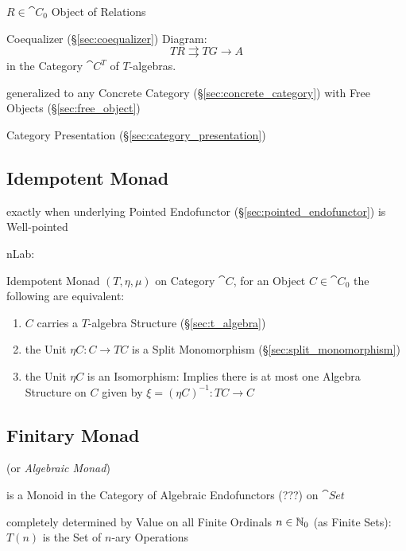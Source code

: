 $R \in \cat{C}_0$ Object of Relations

Coequalizer (\S\ref{sec:coequalizer}) Diagram:
\[
  T R \rightrightarrows T G \rightarrow A
\]
in the Category $\cat{C}^T$ of $T$-algebras. %

generalized to any Concrete Category (\S\ref{sec:concrete_category})
with Free Objects (\S\ref{sec:free_object}) %

Category Presentation (\S\ref{sec:category_presentation})



\subsection{Idempotent Monad}\label{sec:idempotent_monad}

exactly when underlying Pointed Endofunctor
(\S\ref{sec:pointed_endofunctor}) is Well-pointed

nLab:

Idempotent Monad $(T, \eta, \mu)$ on Category $\cat{C}$, for an Object
$C \in \cat{C}_0$ the following are equivalent:
\begin{enumerate}
  \item $C$ carries a $T$-algebra Structure (\S\ref{sec:t_algebra})
  \item the Unit $\eta C : C \rightarrow T C$ is a Split Monomorphism
    (\S\ref{sec:split_monomorphism})
  \item the Unit $\eta C$ is an Isomorphism: Implies there is at most
    one Algebra Structure on $C$ given by $\xi = (\eta C)^{-1} : T C
    \rightarrow C$ %
\end{enumerate}



\subsection{Finitary Monad}\label{sec:finitary_monad}

(or \emph{Algebraic Monad})

is a Monoid in the Category of Algebraic Endofunctors (???) on
$\cat{Set}$

completely determined by Value on all Finite Ordinals $n \in \mathbb{N}_0$
(as Finite Sets): $T(n)$ is the Set of $n$-ary Operations

